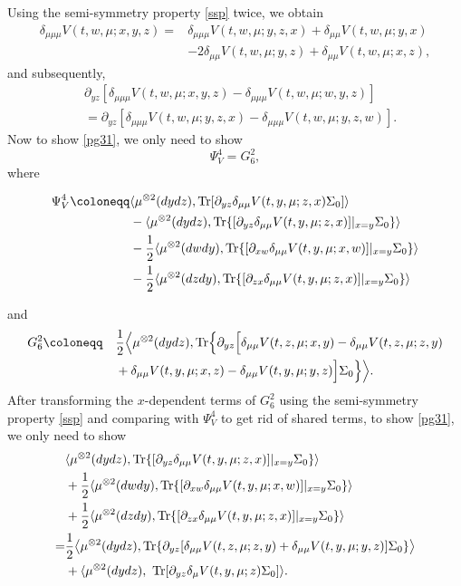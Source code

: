 \documentclass{amsart}
\theoremstyle{definition}
\theoremstyle{remark}
\def\D{\partial}
\numberwithin{equation}{section}
\begin{document}
Using the semi-symmetry property \eqref{ssp} twice, we obtain
\begin{align*}
\delta_{\mu\mu\mu} V(t, w, \mu; x,y,z) =& \delta_{\mu\mu\mu} V(t, w, \mu; y,z,x)+ \delta_{\mu\mu} V(t, w, \mu; y,x)\\
&- 2 \delta_{\mu\mu} V(t, w, \mu; y,z)+\delta_{\mu\mu} V(t, w, \mu; x,z),
\end{align*}
and subsequently,
\begin{align*}
&\partial_{yz}[\delta_{\mu\mu\mu} V(t, w, \mu; x,y,z)-\delta_{\mu\mu\mu} V(t, w, \mu; w,y,z)]\\
&=\partial_{yz}[\delta_{\mu\mu\mu} V(t, w, \mu; y,z,x)-\delta_{\mu\mu\mu} V(t, w, \mu; y,z,w)].
\end{align*}
Now to show \eqref{pg31}, we only need to show
$$
\Psi^4_V= G_6^2,
$$
where
{\allowdisplaybreaks

\begin{align*}
\Psi_V^4 \coloneqq
& \langle \mu^{\otimes2}(dydz), {\rm Tr} [ \D_{yz}\delta_{\mu\mu} V(t,y, \mu;z,x)  \Sigma_0]\rangle \notag  \\
&- \langle \mu^{\otimes2}(dydz), {\rm Tr}\{ [ \D_{yz}\delta_{\mu\mu} V(t,y, \mu;z,x)]|_{x=y}  \Sigma_0 \}\rangle \notag  \\
& - \frac{1}{2}\langle\mu^{\otimes2}(dwdy), {\rm Tr}\{[\D_{xw}\delta_{\mu\mu} V (t, y, \mu; x,w)]|_{x=y}
\Sigma_0\}\rangle\\
& - \frac{1}{2}\langle\mu^{\otimes2}(dzdy), {\rm Tr}\{[\D_{zx}\delta_{\mu\mu} V (t, y, \mu; z,x)]|_{x=y}
\Sigma_0\}\rangle
\end{align*}
}
and
\begin{align*}
G_6^2 \coloneqq  \quad &  \frac12\Big\langle\mu^{\otimes2}(dydz), {\rm Tr}\Big\{  \partial_{yz}\Big[
  \delta_{\mu\mu}  V(t, z,\mu; x,y)- \delta_{\mu\mu}  V(t, z,\mu; z,y)    \\
&+    \delta_{\mu\mu}  V(t, y,\mu; x,z)- \delta_{\mu\mu}  V(t, y,\mu; y,z)  \Big]\Sigma_0\Big\}\Big\rangle.
\end{align*}
After transforming the $x$-dependent terms of $G_6^2$ using the semi-symmetry property \eqref{ssp} and comparing with $\Psi_V^4$ to get rid of shared terms,
 to show \eqref{pg31}, we only need to show
\begin{align}
& \langle \mu^{\otimes2}(dydz), {\rm Tr}\{ [ \D_{yz}\delta_{\mu\mu} V(t,y, \mu;z,x)]|_{x=y}  \Sigma_0 \}\rangle \label{muvc6}  \\
& + \frac{1}{2}\langle\mu^{\otimes2}(dwdy), {\rm Tr}\{[\D_{xw}\delta_{\mu\mu} V (t, y, \mu; x,w)]|_{x=y}
\Sigma_0\}\rangle \notag \\
&  +\frac{1}{2}\langle\mu^{\otimes2}(dzdy), {\rm Tr}\{[\D_{zx}\delta_{\mu\mu} V (t, y, \mu; z,x)]|_{x=y}
\Sigma_0\}\rangle \notag  \\
=&\frac12\big\langle\mu^{\otimes2}(dydz), {\rm Tr}\{  \partial_{yz}[
  \delta_{\mu\mu}  V(t, z,\mu; z,y) + \delta_{\mu\mu}  V(t, y,\mu; y,z)  ]\Sigma_0\}\big\rangle \notag \\
&+ \langle \mu^{\otimes2}(dydz), \  {\rm Tr}[  \partial_{yz}
  \delta_{\mu}  V(t, y,\mu;z)\Sigma_0 ]  \rangle. \notag
\end{align}
\end{document}

